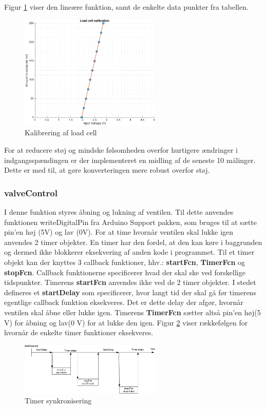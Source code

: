 Figur \ref{fig:loadcellcalib} viser den lineære funktion, samt de enkelte data punkter fra tabellen. 
\begin{figure}[H]
	\centering
	\includegraphics[width=0.6\textwidth]{billeder/software/calibration-crop.pdf}
	\caption{Kalibrering af load cell}
	\label{fig:loadcellcalib}
\end{figure}

For at reducere støj og mindske følsomheden overfor hurtigere ændringer i indgangsspændingen er der implementeret en midling af de seneste 10 målinger. Dette er med til, at gøre konverteringen mere robust overfor støj.  

\newpage
\subsubsection{valveControl} \label{software_ventil}
I denne funktion styres åbning og lukning af ventilen. Til dette anvendes funktionen writeDigitalPin fra Arduino Support pakken, som bruges til at sætte pin'en høj (5V) og lav (0V). For at time hvornår ventilen skal lukke igen anvendes 2 timer objekter. En timer har den fordel, at den kan køre i baggrunden og dermed ikke blokkerer eksekvering af anden kode i programmet. Til et timer objekt kan der knyttes 3 callback funktioner, hhv.: \textbf{startFcn}, \textbf{TimerFcn} og \textbf{stopFcn}. Callback funktionerne specificerer hvad der skal ske ved forskellige tidspunkter. Timerens \textbf{startFcn} anvendes ikke ved de 2 timer objekter. I stedet defineres et \textbf{startDelay} som specificerer, hvor langt tid der skal gå før timerens egentlige callback funktion eksekveres. Det er dette delay der afgør, hvornår ventilen skal åbne eller lukke igen. Timerens \textbf{TimerFcn} sætter altså pin'en høj(5 V) for åbning og lav(0 V) for at lukke den igen.
Figur \ref{fig:timer} viser rækkefølgen for hvornår de enkelte timer funktioner eksekveres. 
\begin{figure}[H]
	\centering
	\includegraphics[width=0.6\textwidth]{billeder/software/timer-crop.pdf}
	\caption{Timer synkronisering}
	\label{fig:timer}
\end{figure}

